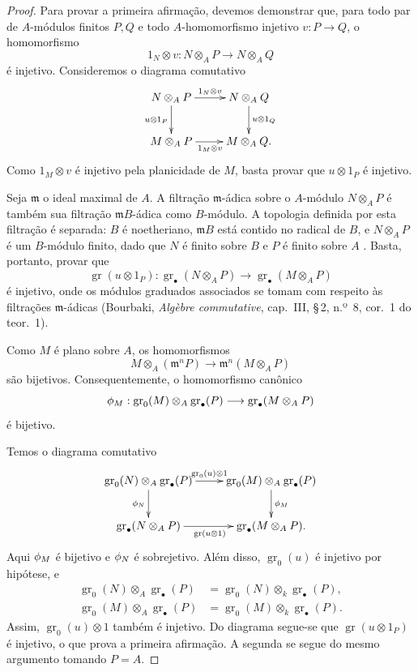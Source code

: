 \begin{proof}
Para provar a primeira afirmação, devemos demonstrar que, para todo par de
$A$-módulos finitos $P,Q$ e todo $A$-homomorfismo injetivo
$v:P\to Q$, o homomorfismo
\[
  1_N\otimes v:N\otimes_A P\longrightarrow N\otimes_A Q
\]
é injetivo. Consideremos o diagrama comutativo
\[
  \xymatrix{
    N\otimes_A P
      \ar[r]^-{1_N\otimes v}
      \ar[d]_{u\otimes1_P}
      &
    N\otimes_A Q
      \ar[d]^{u\otimes1_Q}
    \\
    M\otimes_A P
      \ar[r]_{1_M\otimes v}
      &
    M\otimes_A Q .
  }
\]
Como $1_M\otimes v$ é injetivo pela planicidade de $M$, basta
provar que $u\otimes1_P$ é injetivo.

Seja $\mathfrak m$ o ideal maximal de $A$. A
filtração $\mathfrak m$-ádica sobre o $A$-módulo $N\otimes_A P$ é
também sua filtração $\mathfrak mB$-ádica como $B$-módulo. A
topologia definida por esta filtração é separada: $B$ é
noetheriano, $\mathfrak mB$ está contido no radical de $B$, e
$N\otimes_A P$ é um $B$-módulo finito, dado que $N$ é finito sobre $B$
e $P$ é finito sobre $A$ . Basta, portanto,
provar que
\[
  \operatorname{gr}(u\otimes1_P):
  \operatorname{gr}_\bullet(N\otimes_A P)
  \longrightarrow
  \operatorname{gr}_\bullet(M\otimes_A P)
\]
é injetivo, onde os módulos graduados associados se tomam com
respeito às filtrações $\mathfrak m$-ádicas (Bourbaki,
\emph{Alg\`ebre commutative}, cap.~III, \S\,2, n.º~8, cor.~1 do
teor.~1).

Como $M$ é plano sobre $A$, os homomorfismos
\[
  M\otimes_A(\mathfrak m^nP)
  \longrightarrow
  \mathfrak m^n(M\otimes_A P)
\]
são bijetivos. Consequentemente, o homomorfismo canônico
\[
  \phi_M:
  \operatorname{gr}_0(M)\otimes_A\operatorname{gr}_\bullet(P)
  \longrightarrow
  \operatorname{gr}_\bullet(M\otimes_A P)
\]
é bijetivo.


Temos o diagrama comutativo
\[
  \xymatrix{
    \operatorname{gr}_0(N)\otimes_A\operatorname{gr}_\bullet(P)
      \ar[r]^-{\operatorname{gr}_0(u)\otimes1}
      \ar[d]_{\vphi_N}
      &
    \operatorname{gr}_0(M)\otimes_A\operatorname{gr}_\bullet(P)
      \ar[d]^{\vphi_M}
    \\
    \operatorname{gr}_\bullet(N\otimes_A P)
      \ar[r]_{\operatorname{gr}(u\otimes1)}
      &
    \operatorname{gr}_\bullet(M\otimes_A P).
  }
\]
Aqui $\phi_M$ é bijetivo e $\phi_N$ é sobrejetivo.
Além disso, $\operatorname{gr}_0(u)$ é injetivo por hipótese, e
\[
\begin{split}
  \operatorname{gr}_0(N)\otimes_A\operatorname{gr}_\bullet(P)
    &=
  \operatorname{gr}_0(N)\otimes_k\operatorname{gr}_\bullet(P),\\
  \operatorname{gr}_0(M)\otimes_A\operatorname{gr}_\bullet(P)
    &=
  \operatorname{gr}_0(M)\otimes_k\operatorname{gr}_\bullet(P).
\end{split}
\]
Assim, $\operatorname{gr}_0(u)\otimes1$ também é injetivo. Do
diagrama segue-se que $\operatorname{gr}(u\otimes1_P)$ é
injetivo, o que prova a primeira afirmação. A segunda se segue do
mesmo argumento tomando $P=A$.
\end{proof}

